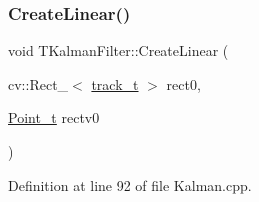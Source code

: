 \subsubsection{\texorpdfstring{Create\+Linear()}{CreateLinear()}\hspace{0.1cm}{\footnotesize\ttfamily [2/2]}}
{\footnotesize\ttfamily void T\+Kalman\+Filter\+::\+Create\+Linear (\begin{DoxyParamCaption}\item[{cv\+::\+Rect\+\_\+$<$ \mbox{\hyperlink{defines_8h_a7ce9c8817b42ab418e61756f579549ab}{track\+\_\+t}} $>$}]{rect0,  }\item[{\mbox{\hyperlink{defines_8h_a8c42696da8f098b91374a8e8bb84b430}{Point\+\_\+t}}}]{rectv0 }\end{DoxyParamCaption})\hspace{0.3cm}{\ttfamily [private]}}



Definition at line 92 of file Kalman.\+cpp.


